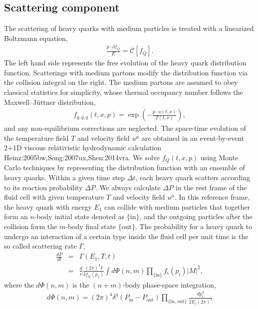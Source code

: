 \subsection{Scattering component}
The scattering of heavy quarks with medium particles is treated with a linearized Boltzmann equation,
\begin{eqnarray}
    \frac{p \cdot \partial f_Q}{E} = \mathcal{C}[f_Q].
\end{eqnarray}
The left hand side represents the free evolution of the heavy quark distribution function. 
Scatterings with medium partons modify the distribution function via the collision integral on the right.
The medium partons are assumed to obey classical statistics for simplicity, whose thermal occupancy number follows the Maxwell--J\"uttner distribution, 
\begin{eqnarray}
f_{q,\bar{q}, g}(t,x,p) = \exp\left(-\frac{p \cdot u(t,x)}{T(t,x)}\right),
\end{eqnarray}
and any non-equilibrium corrections are neglected.
The space-time evolution of the temperature field $T$ and velocity field $u^\mu$ are obtained in an event-by-event 2+1D viscous relativistic hydrodynamic calculation {Heinz:2005bw,Song:2007ux,Shen:2014vra}.
We solve $f_Q(t,x,p)$ using Monte Carlo techniques by representing the distribution function with an ensemble of heavy quarks.
Within a given time step $\Delta t$, each heavy quark scatters according to its reaction probability $\Delta P$.
We always calculate $\Delta P$ in the rest frame of the fluid cell with given temperature $T$ and velocity field $u^\mu$.
In this reference frame, the heavy quark with energy $E_1$ can collide with medium particles that together form an $n$-body initial state denoted as $\{\textrm{in}\}$, and the outgoing particles after the collision form the $m$-body final state $\{\textrm{out}\}$.
The probability for a heavy quark to undergo an interaction of a certain type inside the fluid cell per unit time is the so called scattering rate $\Gamma$,
\begin{eqnarray}\label{eq:rate}
    \frac{dP}{dt} &=& \Gamma(E_1, T, t) \nonumber \\
    &=& \frac{d}{\nu} \frac{(2\pi)^3\delta}{\delta f_Q(p_1)}\int d\Phi(n,m) \prod_{\textrm{\{in\}}} f_i(p_i) 
\overline{|M|^2},
\end{eqnarray}
where the $d\Phi(n,m)$ is the $(n+m)$-body phase-space integration,
\begin{eqnarray}
\nonumber
d\Phi(n,m) = (2\pi)^4\delta^4\left(P_{\textrm{in}}-P_{\textrm{out}}\right)\prod_{\{\textrm{in, out}\}} \frac{dp_i^3}{2E_i(2\pi)^3} 
\end{eqnarray}
